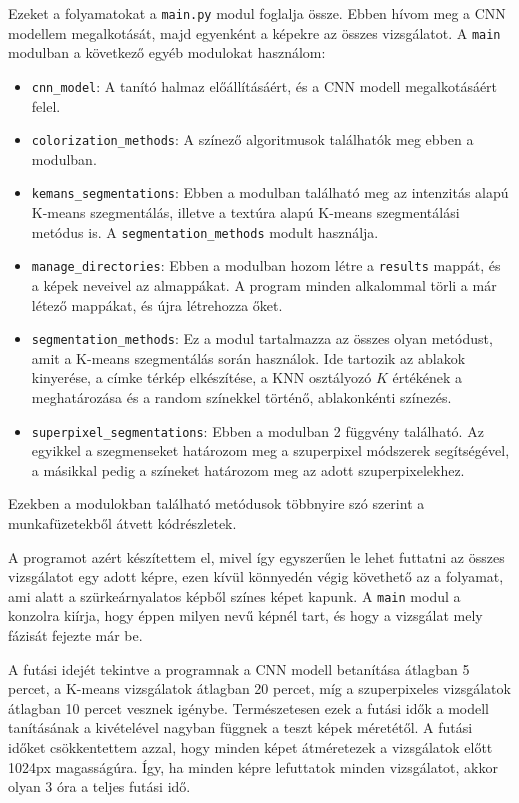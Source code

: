 Ezeket a folyamatokat a \texttt{main.py} modul foglalja össze. Ebben hívom meg a CNN modellem megalkotását, majd egyenként a képekre az összes vizsgálatot. A \texttt{main} modulban a következő egyéb modulokat használom:
\begin{itemize}
\item \texttt{cnn\_model}: A tanító halmaz előállításáért, és a CNN modell megalkotásáért felel.
\item \texttt{colorization\_methods}: A színező algoritmusok találhatók meg ebben a modulban.
\item \texttt{kemans\_segmentations}: Ebben a modulban található meg az intenzitás alapú K-means szegmentálás, illetve a textúra alapú K-means szegmentálási metódus is. A \texttt{segmentation\_methods} modult használja.
\item \texttt{manage\_directories}: Ebben a modulban hozom létre a \texttt{results} mappát, és a képek neveivel az almappákat. A program minden alkalommal törli a már létező mappákat, és újra létrehozza őket.
\item \texttt{segmentation\_methods}: Ez a modul tartalmazza az összes olyan metódust, amit a K-means szegmentálás során használok. Ide tartozik az ablakok kinyerése, a címke térkép elkészítése, a KNN osztályozó $K$ értékének a meghatározása és a random színekkel történő, ablakonkénti színezés.
\item \texttt{superpixel\_segmentations}: Ebben a modulban 2 függvény található. Az egyikkel a szegmenseket határozom meg a szuperpixel módszerek segítségével, a másikkal pedig a színeket határozom meg az adott szuperpixelekhez. 
\end{itemize}

Ezekben a modulokban található metódusok többnyire szó szerint a munkafüzetekből átvett kódrészletek.

A programot azért készítettem el, mivel így egyszerűen le lehet futtatni az összes vizsgálatot egy adott képre, ezen kívül könnyedén végig követhető az a folyamat, ami alatt a szürkeárnyalatos képből színes képet kapunk. A \texttt{main} modul a konzolra kiírja, hogy éppen milyen nevű képnél tart, és hogy a vizsgálat mely fázisát fejezte már be.

A futási idejét tekintve a programnak a CNN modell betanítása átlagban 5 percet, a K-means vizsgálatok átlagban 20 percet, míg a szuperpixeles vizsgálatok átlagban 10 percet vesznek igénybe. Természetesen ezek a futási idők a modell tanításának a kivételével nagyban függnek a teszt képek méretétől. A futási időket csökkentettem azzal, hogy minden képet átméretezek a vizsgálatok előtt 1024px magasságúra. Így, ha minden képre lefuttatok minden vizsgálatot, akkor olyan 3 óra a teljes futási idő.

